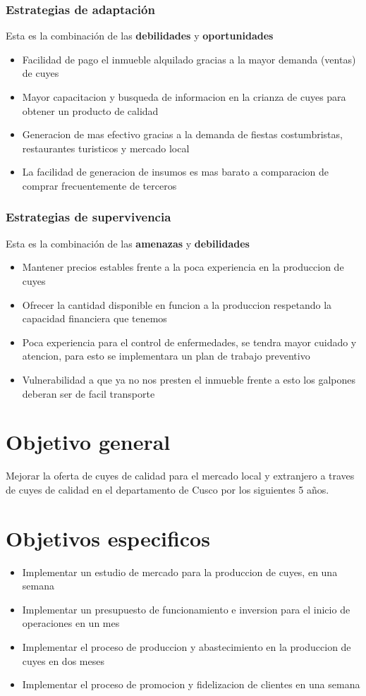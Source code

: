 \documentclass[11pt]{article}
\begin{document}
\subsubsection{Estrategias de adaptación}
Esta es la combinación de las \textbf{debilidades} y \textbf{oportunidades}
\begin{itemize}
    \item Facilidad de pago el inmueble alquilado gracias a la mayor demanda (ventas) de cuyes
    \item Mayor capacitacion y busqueda de informacion en la crianza de cuyes para obtener un producto de calidad
    \item Generacion de mas efectivo gracias a la demanda de fiestas costumbristas, restaurantes turisticos y mercado local
    \item La facilidad de generacion de insumos es mas barato a comparacion de comprar frecuentemente de terceros
\end{itemize}
\subsubsection{Estrategias de supervivencia}
Esta es la combinación de las \textbf{amenazas} y \textbf{debilidades}
    \begin{itemize}
        \item Mantener precios estables frente a la poca experiencia en la produccion de cuyes
        \item Ofrecer la cantidad disponible en funcion a la produccion respetando la capacidad financiera que tenemos
        \item Poca experiencia para el control de enfermedades, se tendra mayor cuidado y atencion, para esto se implementara un plan de trabajo preventivo
        \item Vulnerabilidad a que ya no nos presten el inmueble frente a esto los galpones deberan ser de facil transporte
    \end{itemize}
\section{Objetivo general}
Mejorar la oferta de cuyes de calidad para el mercado local y extranjero a traves de cuyes de calidad en el departamento de Cusco por los siguientes 5 años.
\section{Objetivos especificos}
\begin{itemize}
    \item Implementar un estudio de mercado para la produccion de cuyes, en una semana
    \item Implementar un presupuesto de funcionamiento e inversion para el inicio de operaciones en un mes
    \item Implementar el proceso de produccion y abastecimiento en la produccion de cuyes en dos meses
    \item Implementar el proceso de promocion y fidelizacion de clientes en una semana
\end{itemize}
\end{document}
